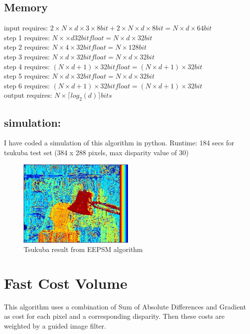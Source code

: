 \subsection*{Memory}
input requires: $2 \times N \times d \times 3 \times 8bit + 2 \times N \times d \times 8bit = N \times d \times 64 bit$ \\
step 1 requires: $N \times \times d 32 bit float = N \times d \times 32 bit$\\
step 2 requires: $N \times 4 \times 32 bit float = N \times 128 bit$\\
step 3 requires: $N \times d \times 32 bit float = N \times d \times 32 bit$\\
step 4 requires: $(N \times d + 1) \times 32 bit float = (N \times d + 1)\times 32 bit$\\
step 5 requires: $N \times d \times 32 bit float = N \times d \times 32 bit$\\
step 6 requires: $(N \times d + 1) \times 32 bit float = (N \times d + 1)\times 32 bit$\\
output requires: $N \times \lceil log_2 (d) \rceil bits$

\subsection*{simulation:}
I have coded a simulation of this algorithm in python. Runtime: 184 secs for tsukuba test set (384 x 288 pixels, max disparity value of 30)

\begin{figure}
  \centering
  \includegraphics[width=0.5\textwidth]{images/test.jpg}
  \caption{Tsukuba result from EEPSM algorithm}
  \label{fig:eepsmtsu}
\end{figure}

\section{Fast Cost Volume}

This algorithm uses a combination of Sum of Absolute Differences and Gradient as cost for each pixel and a corresponding disparity. Then these costs are weighted by a guided image filter.

